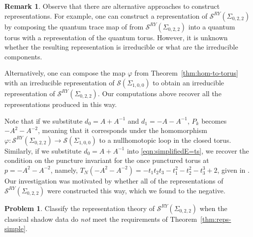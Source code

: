 \documentclass{article}
\renewcommand{\phi}{\varphi}
\renewcommand{\S}{\mathcal{S}}
\newcommand{\SRY}{\mathcal{S}^{RY}}
\newcommand{\san}{\Sigma_{0,2,2}}
\theoremstyle{definition}
\newtheorem{remark}[theorem]{Remark}
\newtheorem{problem}[theorem]{Problem}
\renewcommand{\san}{\Sigma_{0, 2, 2}}
\renewcommand{\SRY}{\ensuremath{ \mathcal S^{RY}}}
\begin{document}
\begin{remark} Observe  that there are alternative approaches to construct representations.  For example, one can construct a representation of $\S^{RY}(\Sigma_{0,2,2})$ by composing the quantum trace map of \cite{BKLQTrace} from $\S^{RY}(\Sigma_{0,2,2})$ into a quantum torus with a representation of the quantum torus.  However, it is unknown whether the resulting representation is irreducible or what are the irreducible components.  

Alternatively, one can compose the map $\phi$ from Theorem~\ref{thm:hom-to-torus} with an  irreducible representation of $\mathcal{S}(\Sigma_{1,0,0})$ \cite{FrohmanGelca, TakenovReps, YuReps} to obtain  an irreducible representation of $\S^{RY}(\Sigma_{0,2,2})$.  Our computations above recover all the representations produced in this way.  

Note that if we substitute $d_0=A+A^{-1}$ and $d_1=-A-A^{-1}$, $P_k$ becomes $-A^2-A^{-2}$, meaning that it corresponds under the homomorphism $\phi: \mathcal{S}^{RY}(\Sigma_{0,2,2})\to \mathcal{S}(\Sigma_{1,0,0})$ to a nullhomotopic loop in the closed torus. Similarly, if we substitute $d_0=A+A^{-1}$ into \eqref{eqn:simplifiedE=ts}, we recover the condition on the puncture invariant for the once punctured torus at $p=-A^2-A^{-2}$, namely, $T_N(-A^2-A^{-2})=-t_1t_2t_3-t_1^2-t_2^2-t_3^3+2$, given in  \cite[Lem.~7]{TakenovReps}.   Our investigation was motivated by whether all of the representations of $\SRY(\san)$ were constructed this way, which we found to the negative.  \\
\end{remark}


\begin{problem}
 Classify the representation theory of $\SRY(\san)$ when the classical shadow data do \emph{not} meet the requirements of Theorem~\ref{thm:reps-simple}.  \end{problem}
\end{document}

